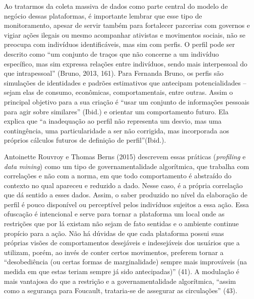 Ao tratarmos da coleta massiva de dados como parte central do modelo de
negócio dessas plataformas, é importante lembrar que esse tipo de
monitoramento, apesar de servir também para fortalecer parcerias com
governos e vigiar ações ilegais ou mesmo acompanhar ativistas e
movimentos sociais, não se preocupa com indivíduos identificáveis, mas
sim com perfis. O perfil pode ser descrito como ``um conjunto de traços
que não concerne a um indivíduo específico, mas sim expressa relações
entre indivíduos, sendo mais interpessoal do que intrapessoal'' (Bruno, 
2013, 161). Para Fernanda Bruno, os perfis são simulações de identidades e
padrões estimativos que antecipam potencialidades ­-- sejam elas de
consumo, econômicas, comportamentais, entre outras. Assim o principal
objetivo para a sua criação é ``usar um conjunto de informações pessoais
para agir sobre similares'' (Ibid.) e orientar um comportamento futuro.
Ela explica que ``a inadequação ao perfil não representa um desvio, mas
uma contingência, uma particularidade a ser não corrigida, mas
incorporada aos próprios cálculos futuros de definição de
perfil''(Ibid.).

Antoinette Rouvroy e Thomas Berns (2015) descrevem essas práticas
(\emph{profiling} e \emph{data mining}) como um tipo de
governamentalidade algorítmica, que trabalha com correlações e não com a
norma, em que todo comportamento é abstraído do contexto no qual
apareceu e reduzido a dado. Nesse caso, é a própria correlação que dá
sentido a esses dados. Assim, o saber produzido no nível da elaboração
de perfil é pouco disponível ou perceptível pelos indivíduos sujeitos a
essa ação. Essa ofuscação é intencional e serve para tornar a plataforma
um local onde as restrições que por lá existam não sejam de fato
sentidas e o ambiente continue propício para a ação. Não há dúvidas de
que cada plataforma possui suas próprias visões de comportamentos
desejáveis e indesejáveis dos usuários que a utilizam, porém, ao invés
de conter certos movimentos, preferem tornar a ``desobediência (ou
certas formas de marginalidade) sempre mais improváveis (na medida em
que estas teriam sempre já sido antecipadas)'' (41). A modulação é mais
vantajosa do que a restrição e a governamentalidade algorítmica, ``assim
como a segurança para Foucault, trataria-se de assegurar as
circulações'' (43).

